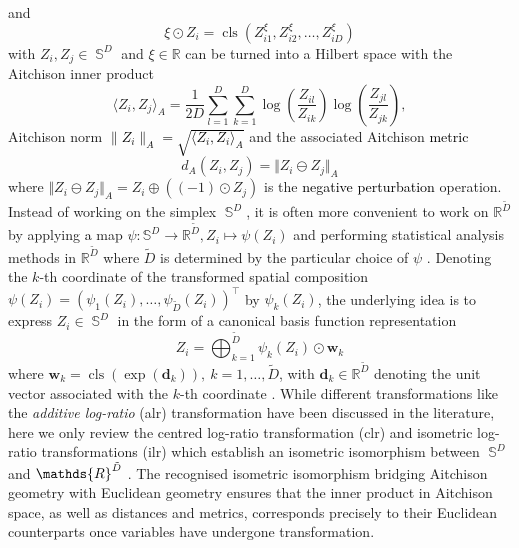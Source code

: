 \documentclass[12pt]{article}
\theoremstyle{plain}
\theoremstyle{definition}
\newcommand{\R}{\mathds{R}}
\DeclareMathOperator{\cls}{cls}
\DeclareMathOperator{\si}{\mathds{S}}
\begin{document}
and 
\[
\xi\odot Z_i=\cls(Z_{i1}^{\xi},Z_{i2}^{\xi},\ldots, Z_{iD}^{\xi})
\]
 with $Z_i,Z_j\in \si^D$ and $\xi\in\mathds{R}$ can be turned into a Hilbert space with the Aitchison inner product 
\begin{equation}\label{eq:AitInner}
   \langle Z_i, Z_j \rangle_A=\frac{1}{2D}\sum^{D}_{l=1}\sum^D_{k=1} \log\left(\frac{Z_{il}}{Z_{ik}}\right)\log\left(\frac{Z_{jl}}{Z_{jk}}\right), 
\end{equation}
Aitchison norm \textcolor{black}{$\|Z_i\|_A = \sqrt{\langle Z_i, Z_i\rangle_A}$} and the associated Aitchison \textcolor{black}{metric} %
 \[
 d_A(Z_i,Z_j)=\Vert Z_i\ominus Z_j \Vert_A
 \]
where $\Vert Z_i\ominus Z_j \Vert_A=Z_i\oplus((-1)\odot Z_j)$ is the \textcolor{black}{negative perturbation} operation. Instead of working on the simplex $\si^D$, it is often more convenient to work on $\R^{\tilde{D}}$ by applying \textcolor{black}{a} map $\psi:\mathds{S}^D\to \mathds{R}^{\tilde{D}}, Z_i\mapsto \psi(Z_i)$ and performing statistical analysis methods in $\R^{\tilde{D}}$ where ${\tilde{D}}$ is determined by the particular choice of $\psi$ \citep{doi:https://doi.org/10.1002/9781119976462.ch3}. Denoting the $k$-th coordinate of the transformed spatial composition $\psi(Z_i)=(\psi_1(Z_i),\ldots, \psi_{\tilde{D}}(Z_i))^\top$ by $\psi_k(Z_i)$, the underlying idea is to express $Z_i\in \si^D$ in the form of a canonical basis function representation 
 \[
 Z_i=\bigoplus^{\tilde{D}}_{k=1}\psi_k(Z_i)\odot\mathbf{w}_k
 \]
where $\mathbf{w}_k=\cls(\exp(\mathbf{d}_k)),~k=1,\ldots,{\tilde{D}}$, with $\mathbf{d}_k\in\mathds{R}^{\tilde{D}}$ denoting the unit vector associated with the $k$-th coordinate \citep{doi:10.1002/9781119976462}. While different transformations like the \textit{additive log-ratio} (alr) transformation  \citep{10.1093/biomet/67.2.261} have been discussed in the literature, here we only review the centred log-ratio transformation (clr) \citep{10.1093/biomet/70.1.57} and isometric log-ratio transformation\textcolor{black}
{s} (ilr) \citep{Egozcue2003} which establish an isometric isomorphism between $\si^D$ and $\mathds{R}^{\Tilde{D}}$ \citep{BillheimerEtAl2001, PawlowskyGlahn2001}. The recognised isometric isomorphism bridging Aitchison geometry with Euclidean geometry ensures that the inner product in Aitchison space, as well as distances and metrics, corresponds precisely to their Euclidean counterparts once variables have undergone transformation. 
\end{document}
